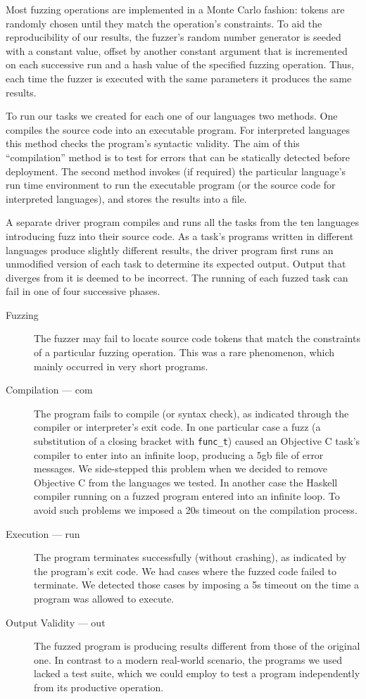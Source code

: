 \documentclass[10pt]{sigplanconf}
\begin{document}
Most fuzzing operations are implemented in a Monte Carlo fashion:
tokens are randomly chosen until they match the operation's constraints.
To aid the reproducibility of our results,
the fuzzer's random number generator is seeded with a constant value,
offset by another constant argument that is incremented on each successive run
and a hash value of the specified fuzzing operation.
Thus, each time the fuzzer is executed with the same parameters it
produces the same results.

To run our tasks we created for each one of our languages two methods.
One compiles the source code into an executable program.
For interpreted languages this method checks the program's syntactic validity.
The aim of this ``compilation'' method is to test for errors that can
be statically detected before deployment.
The second method invokes (if required) the particular language's
run time environment to run the executable program
(or the source code for interpreted languages),
and stores the results into a file.

A separate driver program compiles and runs all the tasks from the ten
languages introducing fuzz into their source code.
As a task's programs written in different languages produce slightly
different results,
the driver program first runs an unmodified version of each task
to determine its expected output.
Output that diverges from it is deemed to be incorrect.
The running of each fuzzed task can fail in one of four successive
phases.
\begin{description}
\item[Fuzzing]
The fuzzer may fail to locate source code tokens that match the
constraints of a particular fuzzing operation.
This was a rare phenomenon, which mainly occurred in very short programs.
\item[Compilation --- com]
The program fails to compile (or syntax check),
as indicated through the compiler or interpreter's exit code.
In one particular case a fuzz
(a substitution of a closing bracket with {\tt func\_t})
caused an Objective C task's compiler
to enter into an infinite loop,
producing a 5{\sc gb} file of error messages.
We side-stepped this problem when we decided to remove Objective C from
the languages we tested.
In another case the Haskell compiler running on a fuzzed program
entered into an infinite loop.
To avoid such problems we imposed a 20s timeout on the compilation process.
\item[Execution --- run]
The program terminates successfully (without crashing),
as indicated by the program's exit code.
We had cases where the fuzzed code failed to terminate.
We detected those cases by imposing a 5s timeout on the time a program
was allowed to execute.
\item[Output Validity --- out]
The fuzzed program is producing results different from those of
the original one.
In contrast to a modern real-world scenario,
the programs we used lacked a test suite,
which we could employ to test a program independently from its productive
operation.
\end{description}
\end{document}
